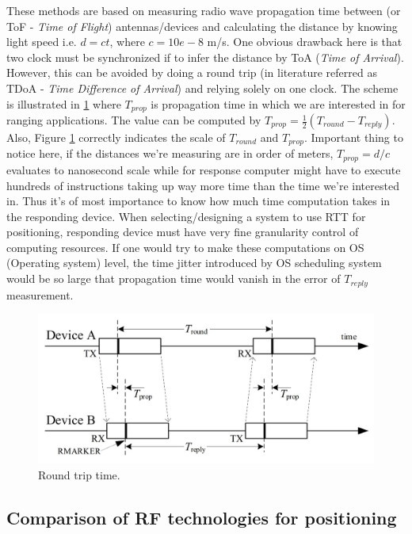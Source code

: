 These methods are based on measuring radio wave propagation time between (or ToF - \emph{Time of Flight}) antennas/devices and calculating the distance by knowing light speed i.e. $d=ct$, where $c=10e-8$ m/s. One obvious drawback here is that two clock must be synchronized if to infer the distance by ToA (\emph{Time of Arrival}). However, this can be avoided by doing a round trip (in literature referred as TDoA - \emph{Time Difference of Arrival}) and relying solely on one clock. The scheme is illustrated in \ref{fig:RTT} where $T_{prop}$ is propagation time in which we are interested in for ranging applications. The value can be computed by $T_{prop} = \frac{1}{2}(T_{round} - T_{reply})$. Also, Figure \ref{fig:RTT} correctly indicates the scale of $T_{round}$ and $T_{prop}$. Important thing to notice here, if the distances we're measuring are in order of meters, $T_{prop} = d/c$ evaluates to nanosecond scale while for response computer might have to execute hundreds of instructions taking up way more time than the time we're interested in. Thus it's of most importance to know how much time computation takes in the responding device. When selecting/designing a system to use RTT for positioning, responding device must have very fine granularity control of computing resources. If one would try to make these computations on OS (Operating system) level, the time jitter introduced by OS scheduling system would be so large that propagation time would vanish in the error of $T_{reply}$ measurement.
\begin{figure}
    \includegraphics[width=\linewidth]{figures/RTT.jpg}
    \caption{Round trip time.}
    \label{fig:RTT}
\end{figure}
  
\subsection{Comparison of RF technologies for positioning}

